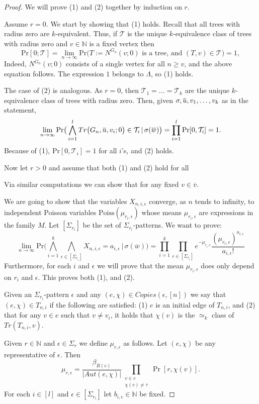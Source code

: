 \documentclass[12pt,notitlepage,a4paper]{article}
\theoremstyle{definition}
\newcommand{\N}{\mathbb{N}}
\newcommand{\Ln}{\lim\limits_{n\to \infty}}
\newcommand{\overbar}[1]{\mkern 1.5mu\overline{\mkern-1.5mu#1\mkern-1.5mu}\mkern 1.5mu}
\begin{document}
	\begin{proof}
		We will prove (1) and (2) together by induction on $r$. \par
		Assume $r=0$. We start by showing that (1) holds. Recall that
		all trees with radius zero are $k$-equivalent. Thus, if
		$\mathcal{T}$ is the unique $k$-equivalence class of trees
		with radius zero
		and $v\in \N$ is a fixed vertex then
		 \[
		 \mathrm{Pr}[0;\mathcal{T}] = \Ln \mathrm{Pr}\big( 
		 T:=N^{G_n}(v;0) \text{ is a tree, and } (T,v)\in \mathcal{T} \big)
		 =1, 
		 \]
		Indeed, $N^{G_n}(v;0)$ consists of a single vertex for all $n\geq v$,
		and the above equation follows. The expression $1$ belongs to 
		$\Lambda$, so (1) holds. \par
		The case of (2) is analogous. As $r=0$, then $\mathcal{T}_1=\dots=
		\mathcal{T}_k$ are the unique $k$-equivalence class of trees with
		radius zero. Then, given $\sigma, \overbar{u}, v_1,\dots, v_k$ as
		in the statement,
		\[\Ln \mathrm{Pr}\big( \bigwedge_{i=1}^l
		Tr\big(G_n, \overbar{u},v_i;0\big)\in \mathcal{T}_i \, | \, \sigma(\overbar{w})
		\big)= \prod_{i=1}^l \mathrm{Pr}[0,\mathcal{T}_i]=1. \]	 	
		Because of (1), $\mathrm{Pr}[0,\mathcal{T}_i]=1$ for all $i$'s, 
		and (2) holds. \par
		Now let $r>0$ and assume that both (1) and (2) hold for all 

		Via similar computations we can show that for any fixed
		$v\in \overline{v}$.
		
		We are going to show that the variables $X_{n,i,\epsilon}$ converge, as
		$n$ tends to infinity, to independent Poisson variables 
		$\mathrm{Poiss}(\mu_{r_i,\epsilon})$ whose means $\mu_{r_i,\epsilon}$ 
		are expressions in the family $M$. Let $[\Sigma_{r_i}]$ be the set of
		$\Sigma_{r_i}$-patterns. We want to prove: 
		\begin{equation} \label{eqn:PoissonEdges}
		\Ln \mathrm{Pr}\Big(
		\bigwedge_{i=1}^k \bigwedge_{\epsilon \in [\Sigma_{r_i}]} X_{n,i,\epsilon}=a_{i,\epsilon}
		\, | \, \sigma(\overline{w})\Big) =
		\prod_{i=1}^k \prod_{\epsilon \in [\Sigma_{r_i}]} e^{-\mu_{r_i,\epsilon}}
		\frac{(\mu_{r_i,\epsilon})^{a_{i,\epsilon}}}{a_{i,\epsilon}!}
		\end{equation}
		Furthermore, for each $i$ and $\epsilon$ we will prove that the mean 
		$\mu_{r_i,\epsilon}$ does only depend on $r_i$ and $\epsilon$.
		This proves both (1), and (2).\par
		Given an $\Sigma_{r_i}$-pattern $\epsilon$ and any 
		$(e,\chi)\in Copies(\epsilon,[n])$ we say that $(e,\chi)\in T_{n,i}$
		if the following are satisfied: (1)	$e$ is an initial edge of $T_{n,i}$,
		and	(2) that for any $v\in e$ such that $v\neq v_i$, it holds that
		$\chi(v)$ is the $\simeq_k$ class of $Tr(T_{n,i},v)$.\par 
		Given $r\in \N$ and $\epsilon\in \Sigma_{r}$
		we define
		$\mu_{r,\epsilon}$ as follows. Let $(e,\chi)$ be any representative of
		$\epsilon$. Then
		\[\mu_{r,\epsilon}=  \frac{\beta_{R(e)}}{|Aut(e,\chi)|}
		\prod_{\substack{v\in e\\ \chi(v)\neq \tau }} \Pr[r,\chi(v)]. \]
		For each $i\in [l]$ and $\epsilon\in [\Sigma_{r_i}]$ let 		
		$b_{i,\epsilon}\in \N$ be fixed. 
	

\end{proof}
\end{document}
